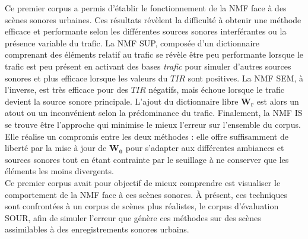 Ce premier corpus a permis d'établir le fonctionnement de la NMF face à des scènes sonores urbaines. Ces résultats révèlent la difficulté à obtenir une méthode efficace et performante selon les différentes sources sonores interférantes ou la présence variable du trafic.
La NMF SUP, composée d'un dictionnaire comprenant des éléments relatif au trafic se révèle être peu performante lorsque le trafic est peu présent en activant des bases \textit{trafic} pour simuler d'autres sources sonores et plus efficace lorsque les valeurs du $TIR$ sont positives. La NMF SEM, à l'inverse, est très efficace pour des $TIR$ négatifs, mais échoue lorsque le trafic devient la source sonore principale. L'ajout du dictionnaire libre $\mathbf{W_r}$ est alors un atout ou un inconvénient selon la prédominance du trafic. Finalement, la NMF IS se trouve être l'approche qui minimise le mieux l'erreur sur l'ensemble du corpus. Elle réalise un compromis entre les deux méthodes : elle offre suffisamment de liberté par la mise à jour de $\mathbf{W_0}$ pour s'adapter aux différentes ambiances et sources sonores tout en étant contrainte par le seuillage à ne conserver que les éléments les moins divergents.\\

Ce premier corpus avait pour objectif de mieux comprendre est visualiser le comportement de la NMF face à ces scènes sonores. À présent, ces techniques sont confrontées à un corpus de scènes plus réalistes, le corpus d'évaluation SOUR, afin de simuler l'erreur que génère ces méthodes sur des scènes assimilables à des enregistrements sonores urbains.




%
